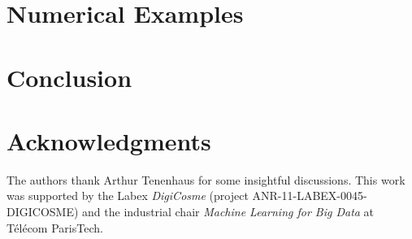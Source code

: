 \section{Numerical Examples}
\label{section:numerical_experiments}

%
%
%
\section{Conclusion}
\label{section:conclusion}

%
%
\section*{Acknowledgments}
The authors thank Arthur Tenenhaus for some insightful discussions. This work
was supported by the Labex \emph{DigiCosme} (project ANR-11-LABEX-0045-DIGICOSME)
 and the industrial chair \emph{
Machine Learning for Big Data} at T\'el\'ecom ParisTech.

\printbibliography
\clearpage

%

